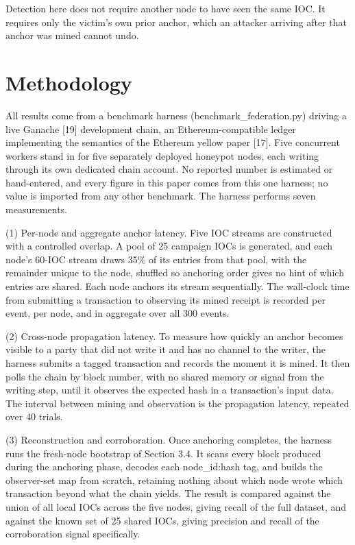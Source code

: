 \documentclass[conference]{IEEEtran}
\begin{document}
Detection here does not require another node to have seen the same IOC. It requires only the victim's own prior anchor, which an attacker arriving after that anchor was mined cannot undo.

\section{Methodology}

All results come from a benchmark harness (benchmark\_federation.py) driving a live Ganache [19] development chain, an Ethereum-compatible ledger implementing the semantics of the Ethereum yellow paper [17]. Five concurrent workers stand in for five separately deployed honeypot nodes, each writing through its own dedicated chain account. No reported number is estimated or hand-entered, and every figure in this paper comes from this one harness; no value is imported from any other benchmark. The harness performs seven measurements.

(1) Per-node and aggregate anchor latency. Five IOC streams are constructed with a controlled overlap. A pool of 25 campaign IOCs is generated, and each node's 60-IOC stream draws 35\% of its entries from that pool, with the remainder unique to the node, shuffled so anchoring order gives no hint of which entries are shared. Each node anchors its stream sequentially. The wall-clock time from submitting a transaction to observing its mined receipt is recorded per event, per node, and in aggregate over all 300 events.

(2) Cross-node propagation latency. To measure how quickly an anchor becomes visible to a party that did not write it and has no channel to the writer, the harness submits a tagged transaction and records the moment it is mined. It then polls the chain by block number, with no shared memory or signal from the writing step, until it observes the expected hash in a transaction's input data. The interval between mining and observation is the propagation latency, repeated over 40 trials.

(3) Reconstruction and corroboration. Once anchoring completes, the harness runs the fresh-node bootstrap of Section 3.4. It scans every block produced during the anchoring phase, decodes each node\_id:hash tag, and builds the observer-set map from scratch, retaining nothing about which node wrote which transaction beyond what the chain yields. The result is compared against the union of all local IOCs across the five nodes, giving recall of the full dataset, and against the known set of 25 shared IOCs, giving precision and recall of the corroboration signal specifically.
\end{document}
